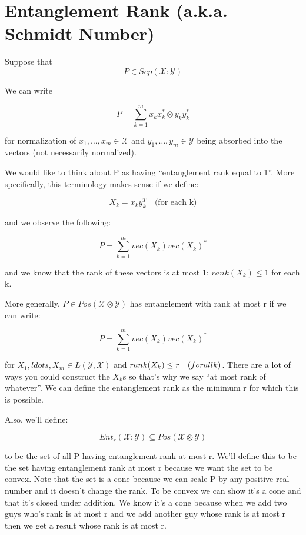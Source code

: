 \documentclass{article}
\begin{document}
\section*{Entanglement Rank (a.k.a. Schmidt Number)}

Suppose that 
\[ 
        P \in Sep(\mathcal{X}:\mathcal{Y}) 
\]

We can write

\[ 
        P = \sum_{k=1}^m x_k x_k^* \otimes y_k y_k^* 
\]

for normalization of $x_1,\ldots,x_m \in \mathcal{X}$ and $y_1,\ldots,y_m \in
\mathcal{Y}$ being absorbed into the vectors (not necessarily normalized). 

We would like to think about P as having ``entanglement rank equal to 1''. More
specifically, this terminology makes sense if we define:

\[ 
        X_k = x_k y_k^T \quad \text{(for each k)}
\]

and we observe the following:

\[ 
        P = \sum_{k=1}^m vec(X_k)vec(X_k)^* 
\]

and we know that the rank of these vectors is at most 1: $rank(X_k) \le 1$ for
each k.

More generally, $P \in Pos(\mathcal{X}\otimes \mathcal{Y})$ has entanglement
with rank at most r if we can write:

\[ 
        P = \sum_{k=1}^m vec(X_k)vec(X_k)^* 
\]

for $ X_1,ldots,X_m \in L(\mathcal{Y},\mathcal{X}) $ and $rank(X_k) \le r \quad
\text(for all k)$. There are a lot of ways you could construct the $X_k$s so
that's why we say ``at most rank of whatever''. We can define the entanglement
rank as the minimum r for which this is possible.

Also, we'll define:

\[ 
        Ent_r(\mathcal{X}:\mathcal{Y}) \subseteq Pos(\mathcal{X}\otimes
        \mathcal{Y})
\]

to be the set of all P having entanglement rank at most r. We'll define this to
be the set having entanglement rank at most r because we want the set to be
convex. Note that the set is a cone because we can scale P by any positive real
number and it doesn't change the rank. To be convex we can show it's a cone and
that it's closed under addition. We know it's a cone because when we add two
guys who's rank is at most r and we add another guy whose rank is at most r then
we get a result whose rank is at most r.
\end{document}
